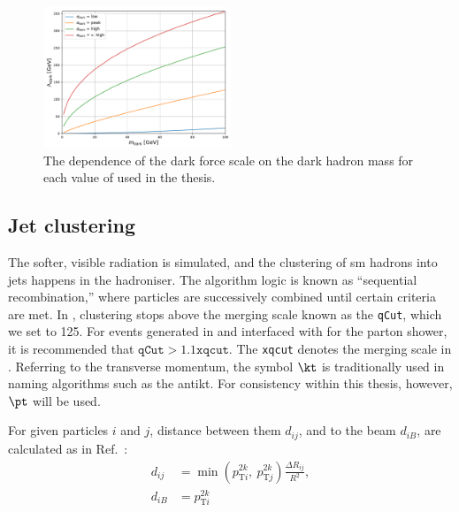 \begin{figure}[htbp]
    \centering
    \includegraphics[width=0.5\textwidth]{figures/lambda_dark_vs_mDark_with_vHigh.pdf}
    \caption[The dependence of the dark force scale \lamDark on the dark hadron mass \mDark for each value of \aDark used in the thesis]{The dependence of the dark force scale \lamDark on the dark hadron mass \mDark for each value of \aDark used in the thesis.}
    \label{fig:svj_lamDark_vs_mDark}
\end{figure}




\subsection{Jet clustering}
\label{subsec:svj_pythia_jet_clustering}

The softer, visible radiation is simulated, and the clustering of \acrshort{sm} hadrons into \glspl{jet} happens in the hadroniser. The algorithm logic is known as ``sequential recombination,'' where particles are successively combined until certain criteria are met. In \PYTHIA, clustering stops above the merging scale known as the \texttt{qCut}, which we set to 125\GeV. For events generated in \MADGRAPH and interfaced with \PYTHIA for the parton shower, it is recommended that $\texttt{qCut} > 1.1 \texttt{xqcut}$. The \texttt{xqcut} denotes the merging scale in \MADGRAPH. Referring to the transverse momentum, the symbol $\kt$ is traditionally used in naming algorithms such as the \gls{antikt}. For consistency within this thesis, however, $\pt$ will be used.

For given particles $i$ and $j$, distance between them $d_{ij}$, and to the beam $d_{iB}$, are calculated as in Ref.~:
\begin{equation}
    \begin{aligned}
d_{ij} &= \min(p_{\mathrm{T}i}^{2k}, \ p_{\mathrm{T}j}^{2k}) \frac{\Delta R_{ij}}{R^2},\\
d_{iB} &= p_{\mathrm{T}i}^{2k}
    \end{aligned}
    \label{eq:distances_kt_pythia}
\end{equation}

